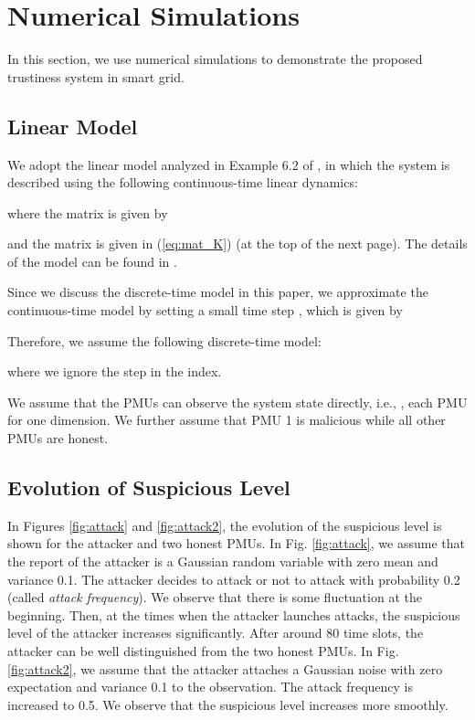 \documentclass[journal,10pt,twocolumn]{IEEEtran}
\begin{document}
\section{Numerical Simulations}\label{sec:numerical}
In this section, we use numerical simulations to demonstrate the proposed trustiness system in smart grid.

\subsection{Linear Model}
We adopt the linear model analyzed in Example 6.2 of \cite{Anderson2003}, in which the system is described using the following continuous-time linear dynamics:

where the matrix  is given by
\begin{small}

\end{small}
and the matrix  is given in (\ref{eq:mat_K}) (at the top of the next page). The details of the model can be found in \cite{Anderson2003}.
\setcounter{equation}{21}

Since we discuss the discrete-time model in this paper, we approximate the continuous-time model by setting a small time step , which is given by

Therefore, we assume the following discrete-time model:

where we ignore the step  in the index.

We assume that the PMUs can observe the system state directly, i.e., , each PMU for one dimension. We further assume that PMU 1 is malicious while all other PMUs are honest.

\begin{figure*}[!t]
\normalsize \setcounter{mytmpeqncnt}{\value{equation}}
\setcounter{equation}{20}

\hrulefill \vspace*{4pt}
\end{figure*}
\setcounter{equation}{23}

\subsection{Evolution of Suspicious Level}
In Figures \ref{fig:attack} and \ref{fig:attack2}, the evolution of the suspicious level is shown for the attacker and two honest PMUs. In Fig. \ref{fig:attack}, we assume that the report of the attacker is a Gaussian random variable with zero mean and variance 0.1. The attacker decides to attack or not to attack with probability 0.2 (called {\em attack frequency}). We observe that there is some fluctuation at the beginning. Then, at the times when the attacker launches attacks, the suspicious level of the attacker increases significantly. After around 80 time slots, the attacker can be well distinguished from the two honest PMUs. In Fig. \ref{fig:attack2}, we assume that the attacker attaches a Gaussian noise with zero expectation and variance 0.1 to the observation. The attack frequency is increased to 0.5. We observe that the suspicious level increases more smoothly.
\end{document}
